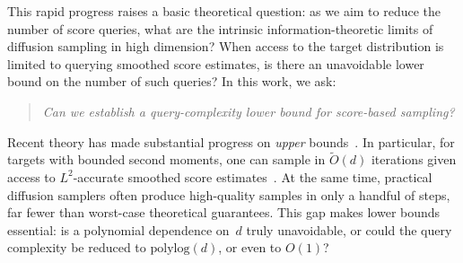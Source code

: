 \documentclass[11pt,letterpaper]{article}
\newcommand{\1}{\mathbbm{1}}
\begin{document}
This rapid progress raises a basic theoretical question: as we aim to reduce the number of score queries, what are the intrinsic information-theoretic limits of diffusion sampling in high dimension?
When access to the target distribution is limited to querying smoothed score estimates, is there an unavoidable lower bound on the number of such queries?
In this work, we ask:
\begin{quote}
  \centering
  \textit{Can we establish a query-complexity lower bound for score-based sampling?}
\end{quote}

Recent theory has made substantial progress on \emph{upper} bounds~\citep{chen2022samplingiseasy,lee2022polynomialcomplexity}.
In particular, for targets with bounded second moments, one can sample in $\widetilde O(d)$ iterations given access to $L^2$-accurate smoothed score estimates~\citep{benton2023linearconvergence}.
At the same time, practical diffusion samplers often produce high-quality
samples in only a handful of steps, far fewer than worst-case theoretical
guarantees.
This gap makes lower bounds essential: is a polynomial dependence on~$d$
truly unavoidable, or could the query complexity be reduced to
$\mathrm{polylog}(d)$, or even to $O(1)$?
\end{document}

